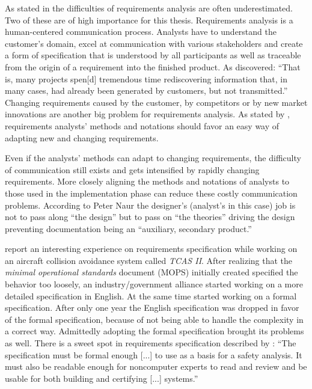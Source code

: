 As stated in \textcite{mayr_projekt_2005} the difficulties of requirements analysis are often underestimated.
Two of these are of high importance for this thesis.
Requirements analysis is a human-centered communication process.
Analysts have to understand the customer's domain, excel at communication with various stakeholders and create a form of specification that is understood by all participants as well as traceable from the origin of a requirement into the finished product.
As \textcite[265]{curtis_psychology_1990} discovered: ``That is, many projects spen[d] tremendous time rediscovering information that, in many cases, had already been generated by customers, but not transmitted.''
Changing requirements caused by the customer, by competitors or by new market innovations are another big problem for requirements analysis.
As stated by \textcite{mayr_projekt_2005}, requirements analysts' methods and notations should favor an easy way of adapting new and changing requirements.

Even if the analysts' methods can adapt to changing requirements, the difficulty of communication still exists and gets intensified by rapidly changing requirements.
More closely aligning the methods and notations of analysts to those used in the implementation phase can reduce these costly communication problems.
According to Peter Naur the designer's (analyst's in this case) job is not to pass along ``the design'' but to pass on ``the theories'' driving the design \autocite{naur_programming_1985} preventing documentation being an ``auxiliary, secondary product.''

\textcite{leveson_experiences_1991} report an interesting experience on requirements specification while working on an aircraft collision avoidance system called \emph{TCAS II}.
After realizing that the \emph{minimal operational standards} document (MOPS) initially created specified the behavior too loosely, an industry/government alliance started working on a more detailed specification in English.
At the same time \textcite{leveson_experiences_1991} started working on a formal specification.
After only one year the English specification was dropped in favor of the formal specification, because of not being able to handle the complexity in a correct way.
Admittedly adopting the formal specification brought its problems as well.
There is a sweet spot in requirements specification described by \textcite{leveson_experiences_1991}: ``The specification must be formal enough [...] to use as a basis for a safety analysis. It must also be readable enough for noncomputer experts to read and review and be usable for both building and certifying [...] systems.''

